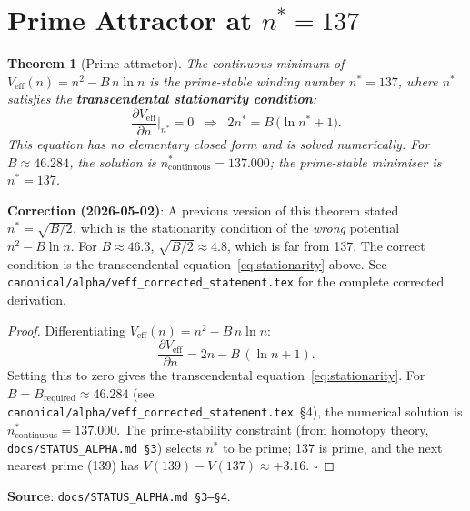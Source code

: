 \documentclass[11pt,a4paper]{article}
\newtheorem{theorem}{Theorem}[section]
\theoremstyle{definition}
\theoremstyle{remark}
\begin{document}
\section{Prime Attractor at $n^* = 137$}\label{sec:prime}

\begin{theorem}[Prime attractor]\label{thm:prime}
The continuous minimum of $V_{\mathrm{eff}}(n) = n^2 - B\,n\ln n$ is the
prime-stable winding number $n^* = 137$, where $n^*$ satisfies the
\textbf{transcendental stationarity condition}:
\begin{equation}\label{eq:stationarity}
  \frac{\partial V_{\mathrm{eff}}}{\partial n}\bigg|_{n^*} = 0
  \;\;\Longrightarrow\;\;
  \boxed{2n^* = B\,\bigl(\ln n^* + 1\bigr).}
\end{equation}
This equation has no elementary closed form and is solved numerically.
For $B \approx 46.284$, the solution is $n^*_{\mathrm{continuous}} = 137.000$;
the prime-stable minimiser is $n^* = 137$.
\end{theorem}

\begin{warnbox}
\textbf{Correction (2026-05-02)}: A previous version of this theorem
stated $n^* = \sqrt{B/2}$, which is the stationarity condition of the
\emph{wrong} potential $n^2 - B\ln n$.
For $B \approx 46.3$, $\sqrt{B/2} \approx 4.8$, which is far from 137.
The correct condition is the transcendental
equation~\eqref{eq:stationarity} above.
See \texttt{canonical/alpha/veff\_corrected\_statement.tex} for the
complete corrected derivation.
\end{warnbox}

\begin{proof}
Differentiating $V_{\mathrm{eff}}(n) = n^2 - B\,n\ln n$:
\[
  \frac{\partial V_{\mathrm{eff}}}{\partial n}
  = 2n - B\,(\ln n + 1).
\]
Setting this to zero gives the transcendental
equation~\eqref{eq:stationarity}.
For $B = B_{\mathrm{required}} \approx 46.284$
(see \texttt{canonical/alpha/veff\_corrected\_statement.tex}~\S4),
the numerical solution is $n^*_{\mathrm{continuous}} = 137.000$.
The prime-stability constraint (from homotopy theory,
\texttt{docs/STATUS\_ALPHA.md \S3}) selects $n^*$ to be prime; 137 is
prime, and the next nearest prime (139) has $V(139) - V(137) \approx +3.16$.
$\square$
\end{proof}

\noindent\textbf{Source}: \texttt{docs/STATUS\_ALPHA.md \S3--\S4}.
\end{document}
